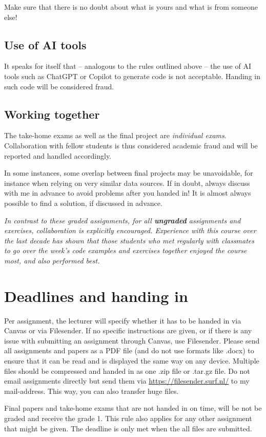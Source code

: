 \documentclass[a4paper,10pt,twocolumn]{report}
\begin{document}
Make sure that there is no doubt about what is yours and what is from someone else!

\subsection{Use of AI tools}
It speaks for itself that -- analogous to the rules outlined above -- the use of AI tools such as ChatGPT or Copilot to generate code is not acceptable. Handing in such code will be considered fraud.

\subsection{Working together}
The take-home exams as well as the final project are \emph{individual exams}. Collaboration with fellow students is thus considered academic fraud and will be reported and handled accordingly.


In some instances, some overlap between final projects may be unavoidable, for instance when relying on very similar data sources. If in doubt, always discuss with me in advance to avoid problems after you handed in! It is almost always possible to find a solution, if discussed in advance.

\emph{In contrast to these graded assignments, for all \textbf{ungraded} assignments and exercises, collaboration is explicitly encouraged. Experience with this course over the last decade has shown that those students who met regularly with classmates to go over the week's code examples and exercises together enjoyed the course most, and also performed best.}

\section{Deadlines and handing in}
Per assignment, the lecturer will specify whether it has to be handed in via Canvas or via Filesender. If no specific instructions are given, or if there is any issue with submitting an assignment through Canvas, use Filesender. Please send all assignments and papers as a PDF file (and do not use formats like .docx) to ensure that it can be read and is displayed the same way on any device. Multiple files should be compressed and handed in as one .zip file or .tar.gz file. Do not email assignments directly but send them via \url{https://filesender.surf.nl/} to my mail-address. This way, you can also transfer huge files.

Final papers and take-home exams that are not handed in on time, will be not be graded and receive the grade 1. This rule also applies for any other assignment that might be given. The deadline is only met when the all files are submitted.
\end{document}
